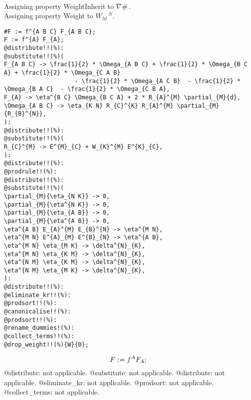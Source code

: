 \documentclass[11pt]{article}
\def\specialcolon{\mathrel{\mathop{:}}\hspace{-.5em}}
\begin{document}
\\
Assigning property WeightInherit to $\nabla{\#}\, $.
\\
Assigning property Weight to ${W}_{M}\,^{N}$.
\\
{\color[named]{Blue}\begin{verbatim}
#F := f^{A B C} F_{A B C};
F := f^{A} F_{A};
@distribute!!(%):
@substitute!!(%)(
F_{A B C} -> \frac{1}{2} * \Omega_{A B C} + \frac{1}{2} * \Omega_{B C A} + \frac{1}{2} * \Omega_{C A B}
                    - \frac{1}{2} * \Omega_{A C B}  - \frac{1}{2} * \Omega_{B A C}  - \frac{1}{2} * \Omega_{C B A},
F_{A} -> \eta^{B C} \Omega_{B C A} + 2 * R_{A}^{M} \partial_{M}{d},
\Omega_{A B C} -> \eta_{K N} R_{C}^{K} R_{A}^{M} \partial_{M}{R_{B}^{N}},
):
@distribute!!(%):
@substitute!!(%)(
R_{C}^{M} -> E^{M}_{C} + W_{K}^{M} E^{K}_{C},
):
@distribute!!(%):
@prodrule!!(%):
@distribute!!(%):
@substitute!!(%)(
\partial_{M}{\eta_{N K}} -> 0,
\partial_{M}{\eta^{N K}} -> 0,
\partial_{M}{\eta_{A B}} -> 0,
\partial_{M}{\eta^{A B}} -> 0,
\eta^{A B} E_{A}^{M} E_{B}^{N} -> \eta^{M N},
\eta^{M N} E^{A}_{M} E^{B}_{N} -> \eta^{A B},
\eta^{M N} \eta_{M K} -> \delta^{N}_{K},
\eta^{M N} \eta_{K M} -> \delta^{N}_{K},
\eta^{N M} \eta_{K M} -> \delta^{N}_{K},
\eta^{N M} \eta_{M K} -> \delta^{N}_{K},
):
@distribute!!(%):
@eliminate_kr!!(%):
@prodsort!!(%):
@canonicalise!!(%):
@prodsort!!(%):
@rename_dummies!(%):
@collect_terms!!(%):
@drop_weight!!(%){W}{0};
\end{verbatim}}
\begin{dmath*}[compact, spread=2pt]
F\specialcolon{}= {f}^{A} {F}_{A};
\end{dmath*}
@distribute: not applicable.
@substitute: not applicable.
@distribute: not applicable.
@eliminate\_kr: not applicable.
@prodsort: not applicable.
@collect\_terms: not applicable.
\end{document}
